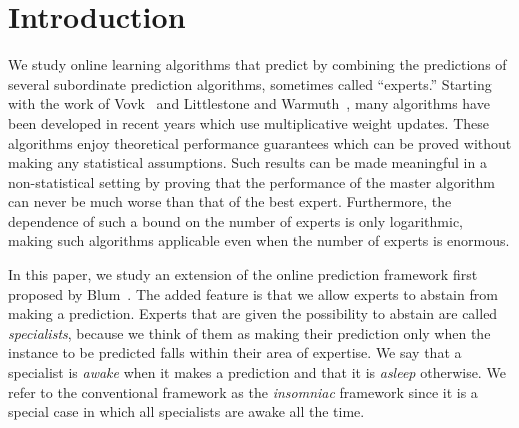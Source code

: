 

\section{Introduction}

We study online learning algorithms
that predict by combining the predictions
of several subordinate prediction algorithms, sometimes called
``experts.''
Starting with the work of
Vovk~\cite{Vovk90} and
Littlestone and Warmuth~\cite{LittlestoneWa94},
many algorithms have been
developed in recent years which use multiplicative weight updates.
These algorithms enjoy theoretical
performance guarantees which can be proved without making any statistical
assumptions.
Such results can be made meaningful in a non-statistical setting by
proving that the performance of the master algorithm can never be much
worse than that of the best expert.
Furthermore, the dependence of such a bound on the number of experts is
only logarithmic, making such algorithms applicable even when the
number of experts is enormous.

In this paper, we study an extension of the online prediction 
framework first proposed by Blum~\cite{Blum95}.
The added feature is that we allow experts to abstain
from making a prediction. 
Experts that are given the possibility to abstain are called
{\em specialists}, because we think of them as making their prediction 
only when the instance to be predicted falls within their area of
expertise. We say that a specialist is {\em awake\/} when it makes a
prediction and that it is {\em asleep\/} otherwise.
We refer to the conventional framework as the {\em
insomniac\/} framework since it is a special case
in which all specialists are awake all the time.

\iffalse
The need for an expert to abstain is common in practical applications
as almost any real world dataset that is used in machine learning
contains records in which some feature values are missing.
A very natural way for dealing with missing values is to consider
experts whose predictions are functions of these values as abstaining.
\fi

